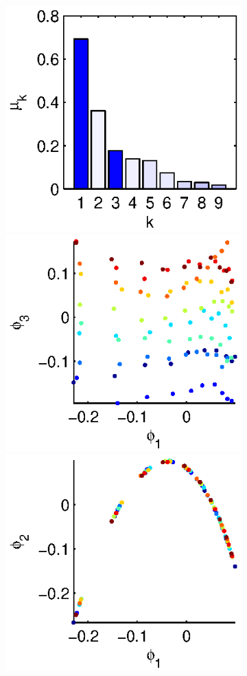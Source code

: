 \documentclass[3p]{elsarticle}
\begin{document}
\begin{figure}[t]
\begin{subfigure}[t]{1.5in}
\includegraphics[height=\figheight]{chemotaxis2_evals}
\includegraphics[height=\figheight]{chemotaxis2_embed_good}
\includegraphics[height=\figheight]{chemotaxis2_embed_bad}

\end{subfigure}
\end{figure}
\end{document}
